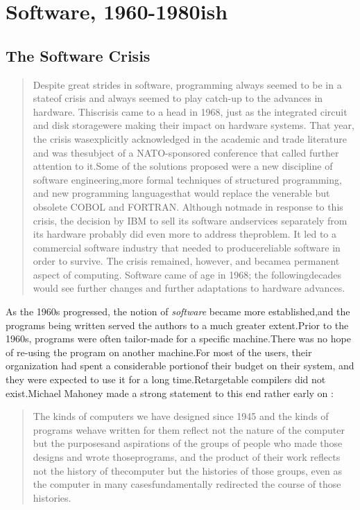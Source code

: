
\chapter{Software, 1960-1980ish}
\section{The Software Crisis}
\begin{quotation}
    Despite great strides in software, programming always seemed to be in a stateof crisis and always seemed to play catch-up to the advances in hardware. Thiscrisis came to a head in 1968, just as the integrated circuit and disk storagewere making their impact on hardware systems. That year, the crisis wasexplicitly acknowledged in the academic and trade literature and was thesubject of a NATO-sponsored conference that called further attention to it.Some of the solutions proposed were a new discipline of software engineering,more formal techniques of structured programming, and new programming languagesthat would replace the venerable but obsolete COBOL and FORTRAN. Although notmade in response to this crisis, the decision by IBM to sell its software andservices separately from its hardware probably did even more to address theproblem. It led to a commercial software industry that needed to producereliable software in order to survive. The crisis remained, however, and becamea permanent aspect of computing. Software came of age in 1968; the followingdecades would see further changes and further adaptations to hardware advances.
\cite{history_of_modern_computing_2003_ceruzzi}
\end{quotation}
As the 1960s progressed, the notion of 
\textit{software} became more established,and the programs being written served the authors to a much greater extent.Prior to the 1960s, programs were often tailor-made for a specific machine.There was no hope of re-using the program on another machine.For most of the users, their organization had spent a considerable portionof their budget on their system, and they were expected to use it for a long time.Retargetable compilers did not exist.Michael Mahoney made a strong statement to this end rather early on 
\cite[The Structures of Computation]{the-first-computers-2002}:
\begin{quotation}
    The kinds of computers we have designed since 1945 and the kinds of programs wehave written for them reflect not the nature of the computer but the purposesand aspirations of the groups of people who made those designs and wrote thoseprograms, and the product of their work reflects not the history of thecomputer but the histories of those groups, even as the computer in many casesfundamentally redirected the course of those histories.
\end{quotation}
